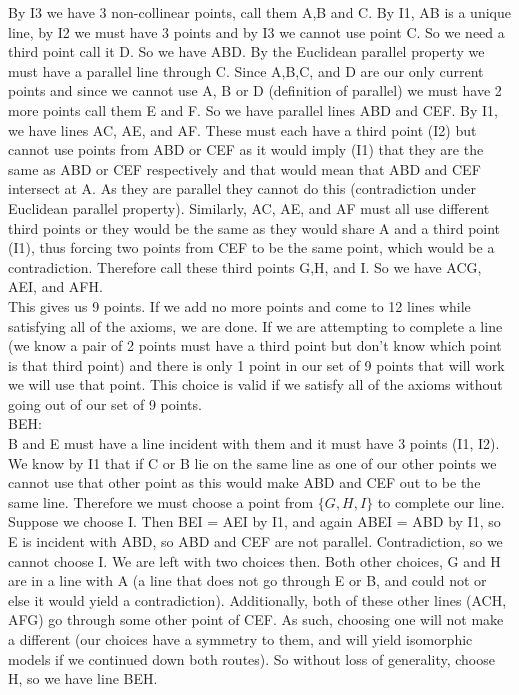 \documentclass[12pt,letterpaper]{article}
\begin{document}
By I3 we have 3 non-collinear points, call them A,B and C. By I1, AB is a unique line, by I2 we must have 3 points and by I3 we cannot use point C.  So we need a third point call it D.  So we have ABD. By the Euclidean parallel property we must have a parallel line through C.  Since A,B,C, and D are our only current points and since we cannot use A, B or D (definition of parallel) we must have 2 more points call them E and F.  So we have parallel lines ABD and CEF.  By I1, we have lines AC, AE, and AF.  These must each have a third point (I2) but cannot use points from ABD or CEF as it would imply (I1) that they are the same as ABD or CEF respectively and that would mean that ABD and CEF intersect at A.  As they are parallel they cannot do this (contradiction under Euclidean parallel property).  Similarly, AC, AE, and AF must all use different third points or they would be the same as they would share A and a third point (I1), thus forcing two points from CEF to be the same point, which would be a contradiction.  Therefore call these third points G,H, and I. So we have ACG, AEI, and AFH.  \\



This gives us 9 points.  If we add no more points and come to 12 lines while satisfying all of the axioms, we are done.  If we are attempting to complete a line (we know a pair of 2 points must have a third point but don't know which point is that third point) and there is only 1 point in our set of 9 points that will work we will use that point.  This choice is valid if we satisfy all of the axioms without going out of our set of 9 points. \\


\noindent BEH:\\

B and E must have a line incident with them and it must have 3 points (I1, I2).  We know by I1 that if C or B lie on the same line as one of our other points we cannot use that other point as this would make ABD and CEF out to be the same line.  Therefore we must choose a point from $\{G,H,I\}$ to complete our line.  Suppose we choose I.  Then BEI = AEI by I1, and again ABEI = ABD by I1, so E is incident with ABD, so ABD and CEF are not parallel.  Contradiction, so we cannot choose I.  We are left with two choices then.  Both other choices, G and H are in a line with A (a line that does not go through E or B, and could not or else it would yield a contradiction).  Additionally, both of these other lines (ACH, AFG) go through some other point of CEF.  As such, choosing one will not make a different (our choices have a symmetry to them, and will yield isomorphic models if we continued down both routes).  So without loss of generality, choose H, so we have line BEH.\\    
\end{document}
